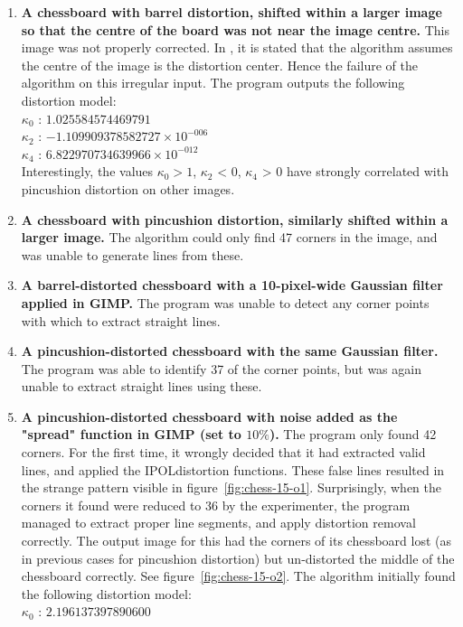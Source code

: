 \begin{enumerate}
  \item \textbf{A chessboard with barrel distortion, shifted within a larger image so that the centre of the board was not near the image centre.} This image was not properly corrected. In \cite{algebraic-distortion}, it is stated that the algorithm assumes the centre of the image is the distortion center. Hence the failure of the algorithm on this irregular input. The program outputs the following distortion model:\\
   $ \kappa_{0}$ : $1.025584574469791$\\
   $ \kappa_{2}$ : $-1.109909378582727 \times 10^{-006}$\\
   $ \kappa_{4}$ : $6.822970734639966 \times 10^{-012}$\\
   Interestingly, the values $\kappa_{0} > 1$, $\kappa_{2}$ < 0, $\kappa_{4}$ > 0 have strongly correlated with pincushion distortion on other images.
  \item \textbf{A chessboard with pincushion distortion, similarly shifted within a larger image.} The algorithm could only find 47 corners in the image, and was unable to generate lines from these.
  \item \textbf{A barrel-distorted chessboard with a 10-pixel-wide Gaussian filter applied in GIMP.} The program was unable to detect any corner points with which to extract straight lines.
  \item \textbf{A pincushion-distorted chessboard with the same Gaussian filter.} The program was able to identify 37 of the corner points, but was again unable to extract straight lines using these.
  \item \textbf{A pincushion-distorted chessboard with noise added as the "spread" function in GIMP (set to $10\%$).} The program only found 42 corners. For the first time, it wrongly decided that it had extracted valid lines, and applied the IPOLdistortion functions. These false lines resulted in the strange pattern visible in figure~\ref{fig:chess-15-o1}. Surprisingly, when the corners it found were reduced to 36 by the experimenter, the program managed to extract proper line segments, and apply distortion removal correctly. The output image for this had the corners of its chessboard lost (as in previous cases for pincushion distortion) but un-distorted the middle of the chessboard correctly. See figure~\ref{fig:chess-15-o2}. The algorithm initially found the following distortion model:\\
   $ \kappa_{0}$ : $2.196137397890600$\\

\end{enumerate}
